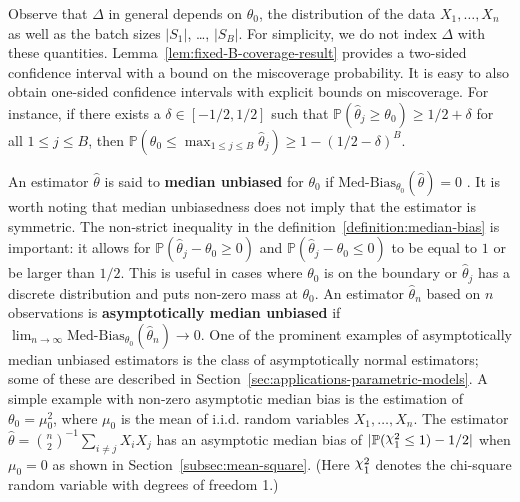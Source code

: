 \documentclass{article}
\numberwithin{myalgctr}{section}
\DeclareRobustCommand{\rchi}{{\mathpalette\irchi\relax}}
\newcommand{\irchi}[2]{\raisebox{\depth}{$#1\chi$}}
\begin{document}
{\color{black}Observe that $\Delta$ in general depends on $\theta_0$, the distribution of the data $X_1, \ldots, X_n$ as well as the batch sizes $|S_1|$, \ldots, $|S_B|$. For simplicity, we do not index $\Delta$ with these quantities. Lemma~\ref{lem:fixed-B-coverage-result} provides a two-sided confidence interval with a bound on the miscoverage probability. It is easy to also obtain one-sided confidence intervals with explicit bounds on miscoverage. For instance, if there exists a $\delta\in[-1/2, 1/2]$ such that $\mathbb{P}(\widehat{\theta}_j \ge \theta_0) \ge 1/2 + \delta$ for all $1\le j\le B$, then $\mathbb{P}(\theta_0 \le \max_{1\le j\le B}\widehat{\theta}_j) \ge 1 - (1/2 - \delta)^B$.}

An estimator $\widehat{\theta}$ is said to {\bf median unbiased} for $\theta_0$ if
$\mbox{Med-Bias}_{\theta_0}(\widehat{\theta}) = 0$
\citep{pfanzagl2011parametric}.
It is worth
noting that median unbiasedness does not imply that the estimator is
symmetric. 
The non-strict inequality
in the definition~\eqref{definition:median-bias} is important:
it allows for
$\mathbb{P}(\widehat{\theta}_j - \theta_0 \ge 0)$ and
$\mathbb{P}(\widehat{\theta}_j - \theta_0 \le 0)$ to be equal to $1$
or be larger than $1/2$. This is useful in cases where 
$\theta_0$ is on the boundary or $\widehat{\theta}_j$ has a discrete
distribution and puts non-zero mass at $\theta_0$. 
An estimator $\widehat\theta_n$ based on $n$ observations 
is {\bf asymptotically median unbiased} if
$\lim_{n\to\infty}\mbox{Med-Bias}_{\theta_0}(\widehat\theta_n)\to 0$.
{\color{black}One of the prominent examples of asymptotically median unbiased estimators is the class of asymptotically normal estimators; some of these are described in Section~\ref{sec:applications-parametric-models}. A simple example with non-zero asymptotic median bias is the estimation of $\theta_0 = \mu_0^2$, where $\mu_0$ is the mean of i.i.d. random variables $X_1, \ldots, X_n$. The estimator $\widehat{\theta} = \binom{n}{2}^{-1}\sum_{i\neq j}X_iX_j$ has an asymptotic median bias of $|\mathbb{P}(\rchi^2_1 \le 1) - 1/2|$ when $\mu_0 = 0$ as shown in Section~\ref{subsec:mean-square}. (Here $\rchi^2_1$ denotes the chi-square random variable with degrees of freedom 1.)}
\end{document}

